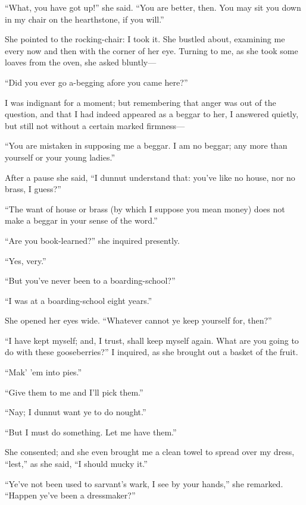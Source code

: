 \enquote{What, you have got up!} she said. \enquote{You are better,
	then. You may sit you down in my chair on the hearthstone, if you
	will.}

She pointed to the rocking-chair: I took it. She bustled about,
examining me every now and then with the corner of her eye. Turning to
me, as she took some loaves from the oven, she asked bluntly---

\enquote{Did you ever go a-begging afore you came here?}

I was indignant for a moment; but remembering that anger was out of the
question, and that I had indeed appeared as a beggar to her, I answered
quietly, but still not without a certain marked firmness---

\enquote{You are mistaken in supposing me a beggar. I am no beggar; any
	more than yourself or your young ladies.}

After a pause she said, \enquote{I dunnut understand that: you've like
	no house, nor no brass, I guess?}

\enquote{The want of house or brass (by which I suppose you mean money)
	does not make a beggar in your sense of the word.}

\enquote{Are you book-learned?} she inquired presently.

\enquote{Yes, very.}

\enquote{But you've never been to a boarding-school?}

\enquote{I was at a boarding-school eight years.}

She opened her eyes wide. \enquote{Whatever cannot ye keep yourself
	for, then?}

\enquote{I have kept myself; and, I trust, shall keep myself again.
	What are you going to do with these gooseberries?} I inquired, as she
brought out a basket of the fruit.

\enquote{Mak' 'em into pies.}

\enquote{Give them to me and I'll pick them.}

\enquote{Nay; I dunnut want ye to do nought.}

\enquote{But I must do something. Let me have them.}

She consented; and she even brought me a clean towel to spread over my
dress, \enquote{lest,} as she said, \enquote{I should mucky it.}

\enquote{Ye've not been used to sarvant's wark, I see by your hands,}
she remarked. \enquote{Happen ye've been a dressmaker?}

